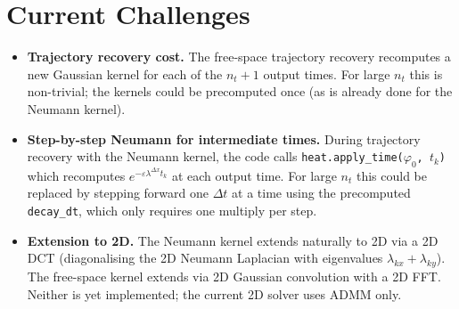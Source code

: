 \documentclass[11pt]{article}
\newcommand{\eps}{\varepsilon}
\newcommand{\dt}{\Delta t}
\newcommand{\dx}{\Delta x}
\theoremstyle{remark}
\begin{document}
\section{Current Challenges}

\begin{itemize}
  \item \textbf{Trajectory recovery cost.}
        The free-space trajectory recovery recomputes a new Gaussian kernel for each of
        the $n_t + 1$ output times.
        For large $n_t$ this is non-trivial; the kernels could be precomputed once (as
        is already done for the Neumann kernel).

  \item \textbf{Step-by-step Neumann for intermediate times.}
        During trajectory recovery with the Neumann kernel, the code calls
        \texttt{heat.apply\_time($\varphi_0$, $t_k$)} which recomputes
        $e^{-\eps\lambda^{\dx} t_k}$ at each output time.
        For large $n_t$ this could be replaced by stepping forward one $\dt$ at a time
        using the precomputed \texttt{decay\_dt}, which only requires one multiply per step.

  \item \textbf{Extension to 2D.}
        The Neumann kernel extends naturally to 2D via a 2D DCT (diagonalising the 2D
        Neumann Laplacian with eigenvalues $\lambda_{kx} + \lambda_{ky}$).
        The free-space kernel extends via 2D Gaussian convolution with a 2D FFT.
        Neither is yet implemented; the current 2D solver uses ADMM only.
\end{itemize}
\end{document}
